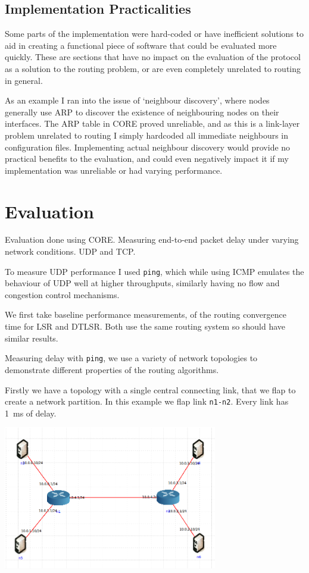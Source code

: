 \documentclass[10pt,twoside,a4paper]{article}
\begin{document}
\subsection{Implementation Practicalities}

Some parts of the implementation were hard-coded or have inefficient solutions to aid in creating a functional piece of software that could be evaluated more quickly. These are sections that have no impact on the evaluation of the protocol as a solution to the routing problem, or are even completely unrelated to routing in general.

As an example I ran into the issue of `neighbour discovery', where nodes generally use ARP to discover the existence of neighbouring nodes on their interfaces. The ARP table in CORE proved unreliable, and as this is a link-layer problem unrelated to routing I simply hardcoded all immediate neighbours in configuration files. Implementing actual neighbour discovery would provide no practical benefits to the evaluation, and could even negatively impact it if my implementation was unreliable or had varying performance.


\section{Evaluation}

Evaluation done using CORE. Measuring end-to-end packet delay under varying network conditions. UDP and TCP.

To measure UDP performance I used \texttt{ping}, which while using ICMP emulates the behaviour of UDP well at higher throughputs, similarly having no flow and congestion control mechanisms.

We first take baseline performance measurements, of the routing convergence time for LSR and DTLSR. Both use the same routing system so should have similar results.

Measuring delay with \texttt{ping}, we use a variety of network topologies to demonstrate different properties of the routing algorithms.

Firstly we have a topology with a single central connecting link, that we flap to create a network partition. In this example we flap link \texttt{n1-n2}. Every link has \SI{1}{\ms} of delay.

\begin{minipage}{1\textwidth} \centering
	\includegraphics[width=0.7\textwidth]{partition}
\end{minipage}
\end{document}
